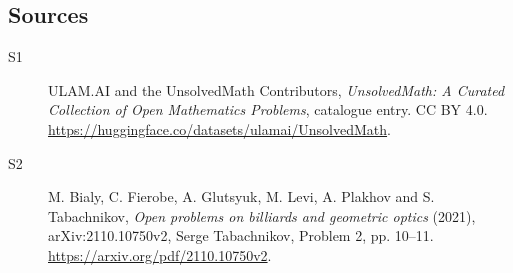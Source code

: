 \documentclass[11pt]{article}
\begin{document}
\subsection{Sources}
\begin{description}
\item[\hypertarget{source:statement:1}{S1}] ULAM.AI and the UnsolvedMath Contributors, \emph{UnsolvedMath: A Curated Collection of Open Mathematics Problems}, catalogue entry. CC BY 4.0. \url{https://huggingface.co/datasets/ulamai/UnsolvedMath}.
\item[\hypertarget{source:statement:2}{S2}] M. Bialy, C. Fierobe, A. Glutsyuk, M. Levi, A. Plakhov and S. Tabachnikov, \emph{Open problems on billiards and geometric optics} (2021), arXiv:2110.10750v2, Serge Tabachnikov, Problem 2, pp. 10--11. \url{https://arxiv.org/pdf/2110.10750v2}.
\end{description}
\label{end:statement}
\end{document}
